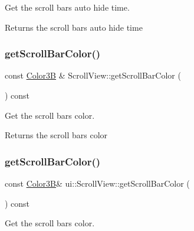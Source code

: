 Get the scroll bar\textquotesingle{}s auto hide time. 

\begin{DoxyReturn}{Returns}
the scroll bar\textquotesingle{}s auto hide time 
\end{DoxyReturn}
\mbox{\label{classui_1_1ScrollView_a8e4bfc4bac7d2d30c3ca34431bcdfe94}} 
\subsubsection{\texorpdfstring{get\+Scroll\+Bar\+Color()}{getScrollBarColor()}\hspace{0.1cm}{\footnotesize\ttfamily [1/2]}}
{\footnotesize\ttfamily const \hyperlink{structColor3B}{Color3B} \& Scroll\+View\+::get\+Scroll\+Bar\+Color (\begin{DoxyParamCaption}{ }\end{DoxyParamCaption}) const}



Get the scroll bar\textquotesingle{}s color. 

\begin{DoxyReturn}{Returns}
the scroll bar\textquotesingle{}s color 
\end{DoxyReturn}
\mbox{\label{classui_1_1ScrollView_a276168caee41740b9ba9a3dee9ea7958}} 
\subsubsection{\texorpdfstring{get\+Scroll\+Bar\+Color()}{getScrollBarColor()}\hspace{0.1cm}{\footnotesize\ttfamily [2/2]}}
{\footnotesize\ttfamily const \hyperlink{structColor3B}{Color3B}\& ui\+::\+Scroll\+View\+::get\+Scroll\+Bar\+Color (\begin{DoxyParamCaption}{ }\end{DoxyParamCaption}) const}



Get the scroll bar\textquotesingle{}s color. 

